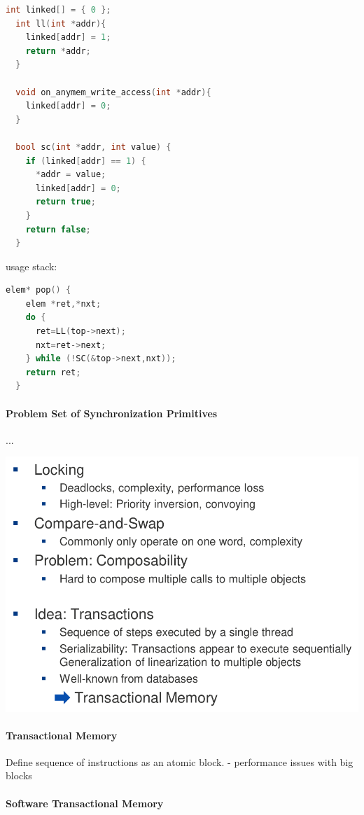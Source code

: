 \documentclass[fontsize=8pt]{scrartcl}
\begin{document}
\begin{multicols*}{4}
\begin{lstlisting}[language=c, numbers=none]
  int linked[] = { 0 };
  int ll(int *addr){
    linked[addr] = 1;
    return *addr;
  }

  void on_anymem_write_access(int *addr){
    linked[addr] = 0;
  }

  bool sc(int *addr, int value) {
    if (linked[addr] == 1) {
      *addr = value;
      linked[addr] = 0;
      return true;
    }
    return false;
  }
\end{lstlisting} %

usage stack:

\begin{lstlisting}[language=c, numbers=none]
  elem* pop() {
    elem *ret,*nxt;
    do {
      ret=LL(top->next);
      nxt=ret->next;
    } while (!SC(&top->next,nxt));
    return ret;
  }
\end{lstlisting} %



\paragraph{Problem Set of Synchronization Primitives}...

\begin{center}
  \centering
  \includegraphics[width=0.8\linewidth]{img/problemSynchrPrimitives.png}
  \label{fig:problemsynchrprimitives}
\end{center}

\paragraph{Transactional Memory} Define sequence of instructions as an atomic block. - performance issues with big blocks

\paragraph{Software Transactional Memory}


\end{multicols*}
\end{document}
